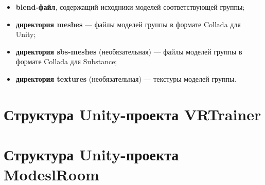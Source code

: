 \begin{itemize}
	\item \textbf{blend-файл}, содержащий исходники моделей соответствующей группы;
	\item \textbf{директория meshes} --- файлы моделей группы в формате Collada для Unity;
	\item \textbf{директория sbs-meshes} (необязательная) --- файлы моделей группы в формате Collada для Substance;
	\item \textbf{директория textures} (необязательная) --- текстуры моделей группы. 
\end{itemize}

\section{Структура Unity-проекта VRTrainer}

\section{Структура Unity-проекта ModeslRoom}






